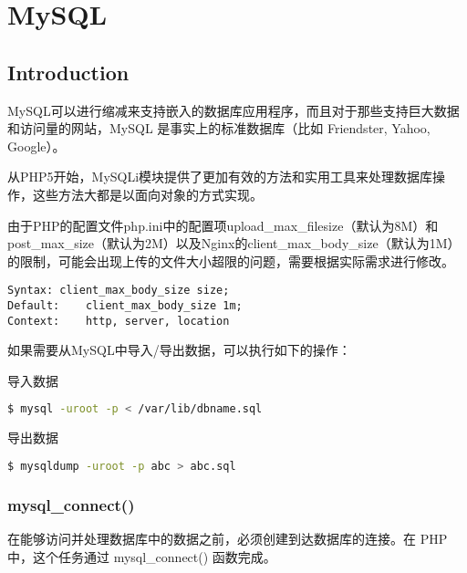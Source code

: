 \part{MySQL}



\chapter{Introduction}








MySQL可以进行缩减来支持嵌入的数据库应用程序，而且对于那些支持巨大数据和访问量的网站，MySQL 是事实上的标准数据库（比如 Friendster, Yahoo, Google）。

从PHP5开始，MySQLi模块提供了更加有效的方法和实用工具来处理数据库操作，这些方法大都是以面向对象的方式实现。

由于PHP的配置文件php.ini中的配置项upload\_max\_filesize（默认为8M）和post\_max\_size（默认为2M）以及Nginx的client\_max\_body\_size（默认为1M）的限制，可能会出现上传的文件大小超限的问题，需要根据实际需求进行修改。

\begin{lstlisting}
Syntax:	client_max_body_size size;
Default:	client_max_body_size 1m;
Context:	http, server, location
\end{lstlisting}

如果需要从MySQL中导入/导出数据，可以执行如下的操作：

\begin{compactitem}
\item 导入数据

\begin{lstlisting}[language=bash]
$ mysql -uroot -p < /var/lib/dbname.sql
\end{lstlisting}

\item 导出数据

\begin{lstlisting}[language=bash]
$ mysqldump -uroot -p abc > abc.sql
\end{lstlisting}

\end{compactitem}

\section{mysql\_connect()}


在能够访问并处理数据库中的数据之前，必须创建到达数据库的连接。在 PHP 中，这个任务通过 mysql\_connect() 函数完成。


